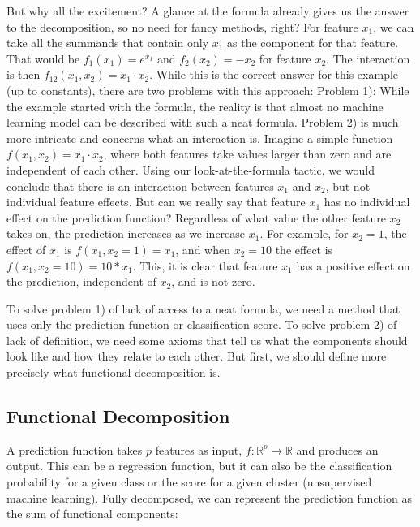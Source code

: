 \documentclass[12pt,]{krantz}
\begin{document}
But why all the excitement? A glance at the formula already gives us the
answer to the decomposition, so no need for fancy methods, right? For
feature \(x_1\), we can take all the summands that contain only \(x_1\)
as the component for that feature. That would be \(f_1(x_1) = e^{x_1}\)
and \(f_2(x_2) = -x_2\) for feature \(x_2\). The interaction is then
\(f_{12}(x_{1},x_{2}) = x_1 \cdot x_2\). While this is the correct
answer for this example (up to constants), there are two problems with
this approach: Problem 1): While the example started with the formula,
the reality is that almost no machine learning model can be described
with such a neat formula. Problem 2) is much more intricate and concerns
what an interaction is. Imagine a simple function
\(f(x_1,x_2) = x_1 \cdot x_2\), where both features take values larger
than zero and are independent of each other. Using our
look-at-the-formula tactic, we would conclude that there is an
interaction between features \(x_1\) and \(x_2\), but not individual
feature effects. But can we really say that feature \(x_1\) has no
individual effect on the prediction function? Regardless of what value
the other feature \(x_2\) takes on, the prediction increases as we
increase \(x_1\). For example, for \(x_2 = 1\), the effect of \(x_1\) is
\(f(x_1, x_2 = 1) = x_1\), and when \(x_2 = 10\) the effect is
\(f(x_1, x_2 = 10) = 10 * x_1\). This, it is clear that feature \(x_1\)
has a positive effect on the prediction, independent of \(x_2\), and is
not zero.

To solve problem 1) of lack of access to a neat formula, we need a
method that uses only the prediction function or classification score.
To solve problem 2) of lack of definition, we need some axioms that tell
us what the components should look like and how they relate to each
other. But first, we should define more precisely what functional
decomposition is.

\subsection{Functional Decomposition}\label{functional-decomposition}

A prediction function takes \(p\) features as input,
\(f: \mathbb{R}^p \mapsto \mathbb{R}\) and produces an output. This can
be a regression function, but it can also be the classification
probability for a given class or the score for a given cluster
(unsupervised machine learning). Fully decomposed, we can represent the
prediction function as the sum of functional components:
\end{document}
